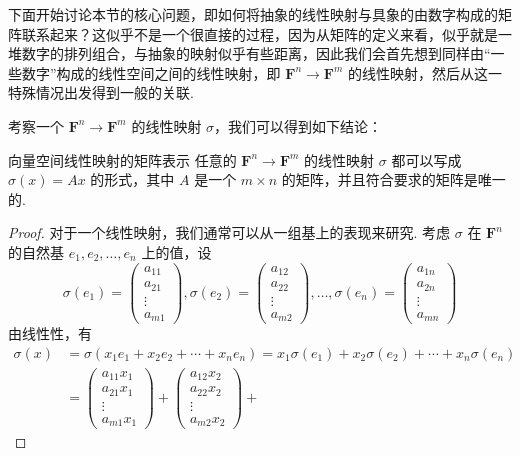 下面开始讨论本节的核心问题，即如何将抽象的线性映射与具象的由数字构成的矩阵联系起来？这似乎不是一个很直接的过程，因为从矩阵的定义来看，似乎就是一堆数字的排列组合，与抽象的映射似乎有些距离，因此我们会首先想到同样由``一些数字''构成的线性空间之间的线性映射，即 $\mathbf{F}^n \to \mathbf{F}^m$ 的线性映射，然后从这一特殊情况出发得到一般的关联.

考察一个 $\mathbf{F}^n \to \mathbf{F}^m$ 的线性映射 $\sigma$，我们可以得到如下结论：
\begin{lemma}{}{向量空间线性映射的矩阵表示}
    任意的 $\mathbf{F}^n \to \mathbf{F}^m$ 的线性映射 $\sigma$ 都可以写成 $\sigma(x) = Ax$ 的形式，其中 $A$ 是一个 $m \times n$ 的矩阵，并且符合要求的矩阵是唯一的.
\end{lemma}

\begin{proof}
    对于一个线性映射，我们通常可以从一组基上的表现来研究. 考虑 $\sigma$ 在 $\mathbf{F}^n$ 的自然基 $e_1, e_2, \ldots, e_n$ 上的值，设
    \[
        \sigma(e_1) = \begin{pmatrix} a_{11} \\ a_{21} \\ \vdots \\ a_{m1} \end{pmatrix},
        \sigma(e_2) = \begin{pmatrix} a_{12} \\ a_{22} \\ \vdots \\ a_{m2} \end{pmatrix},
        \ldots,
        \sigma(e_n) = \begin{pmatrix} a_{1n} \\ a_{2n} \\ \vdots \\ a_{mn} \end{pmatrix}
    \]
    由线性性，有
    \begin{align*}
        \sigma(x) &= \sigma(x_1 e_1 + x_2 e_2 + \cdots + x_n e_n) = x_1 \sigma(e_1) + x_2 \sigma(e_2) + \cdots + x_n \sigma(e_n) \\
        &= \begin{pmatrix} a_{11} x_1 \\ a_{21} x_1 \\ \vdots \\ a_{m1} x_1 \end{pmatrix} +
        \begin{pmatrix} a_{12} x_2 \\ a_{22} x_2 \\ \vdots \\ a_{m2} x_2 \end{pmatrix} +

\end{align*}
\end{proof}
